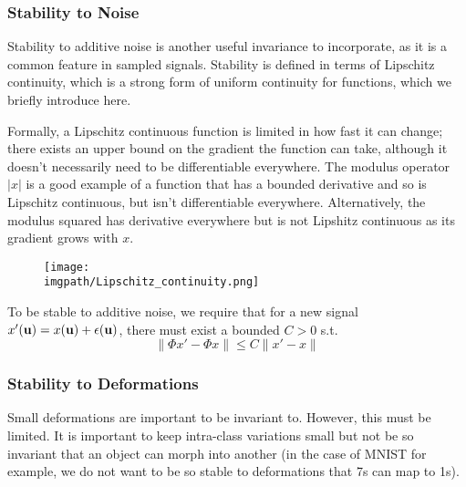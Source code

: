 \subsubsection{Stability to Noise}
  Stability to additive noise is another useful invariance to incorporate,
  as it is a common feature in sampled signals. Stability is defined in terms of
  Lipschitz continuity, which is a strong form of uniform continuity for
  functions, which we briefly introduce here.

  Formally, a Lipschitz continuous function is limited in how fast it can change;
  there exists an upper bound on the gradient the function can take, although it
  doesn't necessarily need to be differentiable everywhere. The modulus operator
  $|x|$ is a good example of a function that has a bounded derivative and so is
  Lipschitz continuous, but isn't differentiable everywhere. Alternatively, the
  modulus squared has derivative everywhere but is not Lipshitz continuous as
  its gradient grows with $x$.

  \begin{figure}
    \begin{center}
      \texttt{[image: \\imgpath/Lipschitz\_continuity.png]}
      \label{fig:lipschitz}
    \end{center}
  \end{figure}

  To be stable to additive noise, we require that for 
  a new signal $x'(\mathbf{u}) = x(\mathbf{u}) + \epsilon(\mathbf{u})$, there must exist
  a bounded $C>0$ s.t.
  \begin{equation}\label{eq:ch2:scat_noise_stability}
    \|\Phi x' - \Phi x\| \leq C \|x' - x\|
  \end{equation}

\subsubsection{Stability to Deformations}
  Small deformations are important to be invariant to. However, this must be
  limited. It is important to keep intra-class variations small but not be so 
  invariant that an object can morph into another (in the case of MNIST for
  example, we do not want to be so stable to deformations that 7s can map to
  1s). 
  
